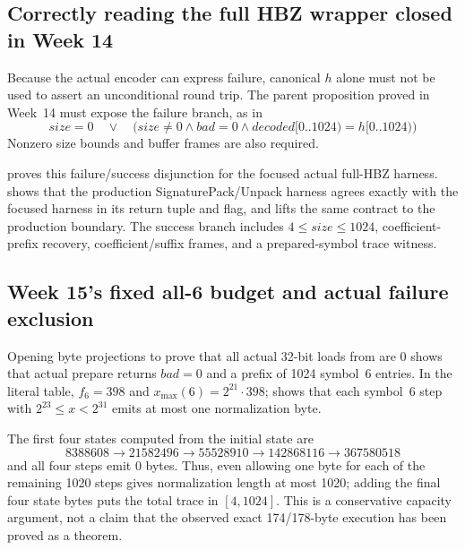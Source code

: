 \subsection{Correctly reading the full HBZ wrapper closed in Week 14}

Because the actual encoder can express failure, canonical \(h\) alone must not
be used to assert an unconditional round trip. The parent proposition proved
in Week~14 must expose the failure branch, as in
\[
  size=0\quad\lor\quad
  \bigl(size\ne0\land bad=0\land
        decoded[0..1024)=h[0..1024)\bigr)
\]
Nonzero size bounds and buffer frames are also required.

\begin{verified}
 proves this
failure/success disjunction for the focused actual full-HBZ harness.
 shows that the
production SignaturePack/Unpack harness agrees exactly with the focused
harness in its return tuple and  flag, and
 lifts the same
contract to the production boundary. The success branch includes
\(4\le size\le1024\), coefficient-prefix recovery, coefficient/suffix frames,
and a prepared-symbol trace witness.
\end{verified}

\subsection{Week 15's fixed all-6 budget and actual failure exclusion}

Opening byte projections to prove that all actual 32-bit loads from
 are 0 shows that actual prepare returns \(bad=0\) and a
prefix of 1024 symbol~6 entries. In the literal table, \(f_6=398\) and
\(x_{\max}(6)=2^{21}\cdot398\);
 shows that each symbol~6 step with
\(2^{23}\le x<2^{31}\) emits at most one normalization byte.

The first four states computed from the initial state are
\[
  8388608\to21582496\to55528910\to142868116\to367580518
\]
and all four steps emit 0 bytes. Thus, even allowing one byte for each of the
remaining 1020 steps gives normalization length at most 1020; adding the final
four state bytes puts the total trace in \([4,1024]\). This is a conservative
capacity argument, not a claim that the observed exact 174/178-byte execution
has been proved as a theorem.

